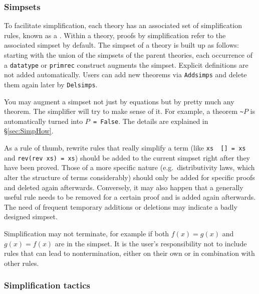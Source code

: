 \subsubsection{Simpsets}

To facilitate simplification, each theory has an associated set of
simplification rules, known as a . Within a theory,
proofs by simplification refer to the associated simpset by default.
The simpset of a theory is built up as follows: starting with the union of
the simpsets of the parent theories, each occurrence of a \texttt{datatype}
or \texttt{primrec} construct augments the simpset. Explicit definitions are
not added automatically. Users can add new theorems via \texttt{Addsimps} and
delete them again later by \texttt{Delsimps}.

You may augment a simpset not just by equations but by pretty much any
theorem. The simplifier will try to make sense of it.  For example, a theorem
\verb$~$$P$ is automatically turned into \texttt{$P$ = False}. The details are
explained in \S\ref{sec:SimpHow}.

As a rule of thumb, rewrite rules that really simplify a term (like
\texttt{xs \at\ [] = xs} and \texttt{rev(rev xs) = xs}) should be added to the
current simpset right after they have been proved.  Those of a more specific
nature (e.g.\ distributivity laws, which alter the structure of terms
considerably) should only be added for specific proofs and deleted again
afterwards.  Conversely, it may also happen that a generally useful rule
needs to be removed for a certain proof and is added again afterwards.  The
need of frequent temporary additions or deletions may indicate a badly
designed simpset.
\begin{warn}
  Simplification may not terminate, for example if both $f(x) = g(x)$ and
  $g(x) = f(x)$ are in the simpset. It is the user's responsibility not to
  include rules that can lead to nontermination, either on their own or in
  combination with other rules.
\end{warn}

\subsubsection{Simplification tactics}


